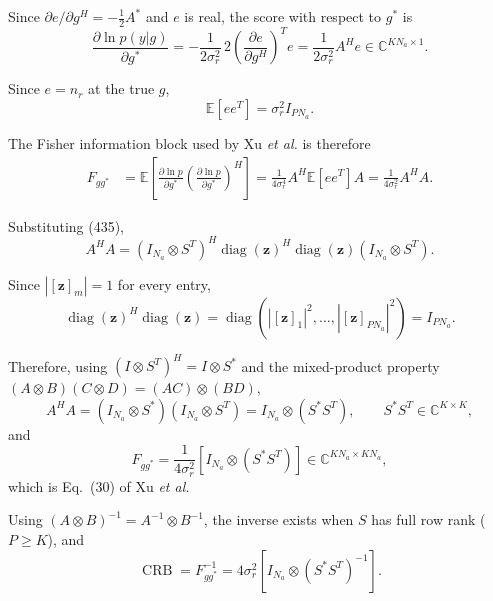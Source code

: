 \documentclass[12pt,a4paper]{article}
\begin{document}
Since $\partial e/\partial g^H=-\tfrac12A^*$ and $e$ is real, the score
with respect to $g^*$ is
\begin{equation}
\boxed{
\frac{\partial\ln p(y|g)}{\partial g^*}
=
-\frac{1}{2\sigma_r^2}\,2\left(\frac{\partial e}{\partial g^H}\right)^{T}e
=
\frac{1}{2\sigma_r^2}A^He
\in\mathbb C^{KN_a\times1}.
}
\tag{445}
\end{equation}

Since $e=n_r$ at the true $g$,
\begin{equation}
\mathbb E[ee^T]
=\sigma_r^2I_{PN_a}.
\tag{446}
\end{equation}

The Fisher information block used by Xu \emph{et al.} is therefore
\begin{equation}
\begin{aligned}
F_{gg^*}
&=
\mathbb E\!\left[
\frac{\partial\ln p}{\partial g^*}
\left(
\frac{\partial\ln p}{\partial g^*}
\right)^H
\right]
=
\frac{1}{4\sigma_r^4}
A^H
\mathbb E[ee^T]
A
=
\frac{1}{4\sigma_r^2}A^HA.
\end{aligned}
\tag{447}
\end{equation}

Substituting (435),
\begin{equation}
A^HA
=
(I_{N_a}\otimes S^T)^H
\operatorname{diag}(\mathbf z)^H
\operatorname{diag}(\mathbf z)
(I_{N_a}\otimes S^T).
\tag{448}
\end{equation}

Since $|[\mathbf z]_m|=1$ for every entry,
\begin{equation}
\operatorname{diag}(\mathbf z)^H\operatorname{diag}(\mathbf z)
=\operatorname{diag}\!\left(|[\mathbf z]_1|^2,\ldots,|[\mathbf z]_{PN_a}|^2\right)
=I_{PN_a}.
\tag{449}
\end{equation}

Therefore, using $(I\otimes S^T)^H=I\otimes S^*$ and the mixed-product
property $(A\otimes B)(C\otimes D)=(AC)\otimes(BD)$,
\begin{equation}
A^HA
=
(I_{N_a}\otimes S^*)
(I_{N_a}\otimes S^T)
=
I_{N_a}\otimes(S^*S^T),
\qquad
S^*S^T\in\mathbb C^{K\times K},
\tag{450}
\end{equation}
and
\begin{equation}
\boxed{
F_{gg^*}
=
\frac{1}{4\sigma_r^2}
\left[
I_{N_a}\otimes(S^*S^T)
\right]
\in\mathbb C^{KN_a\times KN_a},
}
\tag{451}
\end{equation}
which is Eq.~(30) of Xu \emph{et al.}

Using $(A\otimes B)^{-1}=A^{-1}\otimes B^{-1}$, the inverse exists when
$S$ has full row rank ($P\geq K$), and
\begin{equation}
\operatorname{CRB}
=F_{gg^*}^{-1}
=
4\sigma_r^2
\left[
I_{N_a}\otimes(S^*S^T)^{-1}
\right].
\tag{452}
\end{equation}
\end{document}
